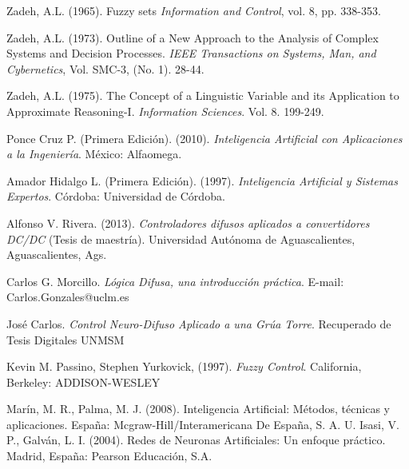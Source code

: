 \begin{thebibliography}{99}
	 Zadeh, A.L. (1965). Fuzzy sets \emph{Information and Control}, vol. 8, pp. 338-353.
	
	 Zadeh, A.L. (1973). Outline of a New Approach to the Analysis of Complex Systems and Decision Processes. \emph{IEEE Transactions on Systems, Man, and Cybernetics}, Vol. SMC-3, (No. 1). 28-44.
	
	 Zadeh, A.L. (1975). The Concept of a Linguistic Variable and its Application to Approximate Reasoning-I. \emph{Information Sciences}. Vol. 8. 199-249.
	
	 Ponce Cruz P. (Primera Edición). (2010).
		\emph{Inteligencia Artificial con Aplicaciones a la Ingeniería}. México: Alfaomega.
	
	 Amador Hidalgo L. (Primera Edición). (1997).
		\emph{Inteligencia Artificial y Sistemas Expertos}. Córdoba: Universidad de Córdoba.
		
	 Alfonso V. Rivera. (2013). \emph{Controladores difusos aplicados a convertidores DC/DC} (Tesis de maestría). Universidad Autónoma de Aguascalientes, Aguascalientes, Ags.
	
	 Carlos G. Morcillo. \emph{Lógica Difusa, una introducción práctica}. E-mail: Carlos.Gonzales@uclm.es
	
	 José Carlos. \emph{Control Neuro-Difuso Aplicado a una Grúa Torre}. Recuperado de Tesis Digitales UNMSM
	
	 Kevin M. Passino, Stephen Yurkovick, (1997). \emph{Fuzzy Control}. California, Berkeley: ADDISON-WESLEY
	
	 Marín, M. R., Palma, M. J. (2008). Inteligencia Artificial: Métodos, técnicas y aplicaciones. España: Mcgraw-Hill/Interamericana De España, S. A. U.
	 Isasi, V. P., Galván, L. I. (2004). Redes de Neuronas Artificiales: Un enfoque práctico. Madrid, España: Pearson Educación, S.A.
	
\end{thebibliography}

